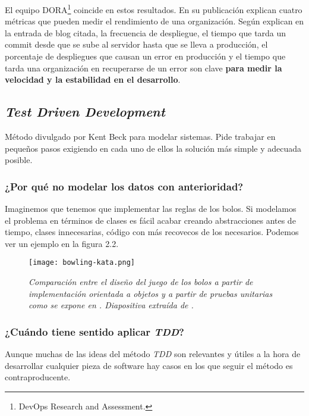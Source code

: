 El equipo DORA\footnote{DevOps Research and Assessment.} coincide en estos resultados.
En su publicación \cite{EliteDevOps} explican cuatro métricas que pueden medir el
rendimiento de una organización. Según explican en la entrada de blog citada,
la frecuencia de despliegue, el tiempo que tarda un commit desde que se sube
al servidor hasta que se lleva a producción,
el porcentaje de despliegues que causan un error en producción y el tiempo
que tarda una organización en recuperarse de un error son clave \textbf{para medir la
velocidad y la estabilidad en el desarrollo}.

\subsection{\textit{Test Driven Development}}

Método divulgado por Kent Beck \cite{TDD} para modelar sistemas.
Pide trabajar en pequeños pasos exigiendo en cada uno de ellos
la solución más simple y adecuada posible.

\subsubsection{¿Por qué no modelar los datos con anterioridad?}

Imaginemos que tenemos que implementar las reglas de los bolos.
Si modelamos el problema en términos de clases es fácil acabar 
creando abstracciones antes de tiempo, clases innecesarias,
código con más recovecos de los necesarios. Podemos ver un ejemplo
en la figura 2.2.

\begin{figure}[!h]
    \centering
    \texttt{[image: bowling-kata.png]}
    \caption{\textit{Comparación entre el diseño del juego de
    los bolos a partir de implementación orientada a objetos
    y a partir de pruebas unitarias como se expone en \cite{TDD}.
    Diapositiva extraída de \cite{BowlingKata}.}}
\end{figure}

\subsubsection{¿Cuándo tiene sentido aplicar \textit{TDD}?}

Aunque muchas de las ideas del método \textit{TDD} son relevantes
y útiles a la hora de desarrollar cualquier pieza de software hay casos
en los que seguir el método es contraproducente.

